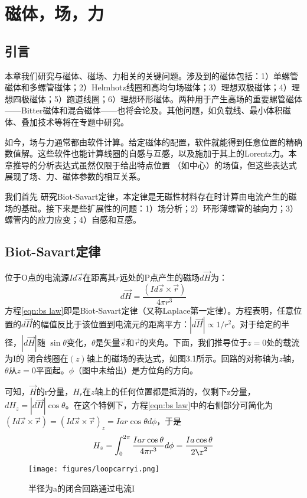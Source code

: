 \chapter{磁体，场，力}
\section{引言}
本章我们研究与磁体、磁场、力相关的关键问题。涉及到的磁体包括：1）单螺管磁体和多螺管磁体；2）Helmhotz线圈和高均匀场磁体；3）理想双极磁体；4）理想四极磁体；5）跑道线圈；6）理想环形磁体。两种用于产生高场的重要螺管磁体——Bitter磁体和混合磁体——也将会论及。其他问题，如负载线、最小体积磁体、叠加技术等将在专题中研究。

如今，场与力通常都由软件计算。给定磁体的配置，软件就能得到任意位置的精确数值解。这些软件也能计算线圈的自感与互感，以及施加于其上的Lorentz力。本章推导的分析表达式虽然仅限于给出特点位置
（如中心）的场值，但这些表达式展现了场、力、磁体参数的相互关系。

我们首先 研究Biot-Savart定律，本定律是无磁性材料存在时计算由电流产生的磁场的基础。接下来是些扩展性的问题：1）场分析；2）环形薄螺管的轴向力；3）螺管内的应力应变；4）自感和互感。

\section{Biot-Savart定律}
位于O点的电流源$Id\vec{s}$在距离其$r$远处的P点产生的磁场$d\vec{H}$为：
\begin{equation}\label{eqn:bs law}
  d\vec{H}=\frac{(Id\vec{s}\times \vec{r})}{4\pi r^3}
\end{equation}
方程\ref{eqn:bs law}即是Biot-Savart定律（又称Laplace第一定律）。方程表明，任意位置的$d\vec{H}$的幅值反比于该位置到电流元的距离平方：$|d\vec{H}|\propto 1/r^2$。对于给定的半径，$|d\vec{H}|$随
$\sin\theta$变化，$\theta$是矢量$\vec{s}$和$\vec{r}$的夹角。下面，我们推导位于$z=0$处的载流为I的
闭合线圈在$(z)$轴上的磁场的表达式，如图3.1所示。回路的对称轴为$z$轴，$\theta$从$z=0$平面起。$\phi$（图中未给出）是方位角的方向。

可知，$\vec{H}$的r分量，$H_r$在$z$轴上的任何位置都是抵消的，仅剩下z分量，$dH_z=|d\vec{H}|\cos\theta$。在这个特例下，方程\ref{eqn:bs law}中的右侧部分可简化为
$(Id\vec{s}\times \vec{r})=(Id\vec{s}\times \vec{r})_z=Iar\cos\theta d\phi$，于是
\begin{equation}\label{eqn:bs law z1}
  H_z=\int_{0}^{2\pi}\frac{Iar\cos\theta}{4\pi r^3}d\phi=\frac{Ia\cos\theta}{2\r^2}
\end{equation}
\begin{figure}[htbp]
  \centering
 \texttt{[image: figures/loopcarryi.png]}
  \caption{半径为a的闭合回路通过电流I}
\end{figure}

